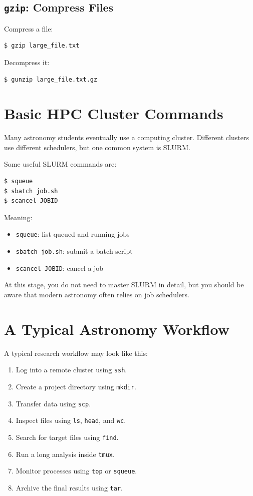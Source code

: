 \subsection{\texttt{gzip}: Compress Files}

Compress a file:

\begin{lstlisting}
$ gzip large_file.txt
\end{lstlisting}

Decompress it:

\begin{lstlisting}
$ gunzip large_file.txt.gz
\end{lstlisting}

\section{Basic HPC Cluster Commands}

Many astronomy students eventually use a computing cluster. Different
clusters use different schedulers, but one common system is SLURM.

Some useful SLURM commands are:

\begin{lstlisting}
$ squeue
$ sbatch job.sh
$ scancel JOBID
\end{lstlisting}

Meaning:

\begin{itemize}
\item \texttt{squeue}: list queued and running jobs
\item \texttt{sbatch job.sh}: submit a batch script
\item \texttt{scancel JOBID}: cancel a job
\end{itemize}

At this stage, you do not need to master SLURM in detail, but you should
be aware that modern astronomy often relies on job schedulers.

\section{A Typical Astronomy Workflow}

A typical research workflow may look like this:

\begin{enumerate}
\item Log into a remote cluster using \texttt{ssh}.
\item Create a project directory using \texttt{mkdir}.
\item Transfer data using \texttt{scp}.
\item Inspect files using \texttt{ls}, \texttt{head}, and \texttt{wc}.
\item Search for target files using \texttt{find}.
\item Run a long analysis inside \texttt{tmux}.
\item Monitor processes using \texttt{top} or \texttt{squeue}.
\item Archive the final results using \texttt{tar}.
\end{enumerate}


